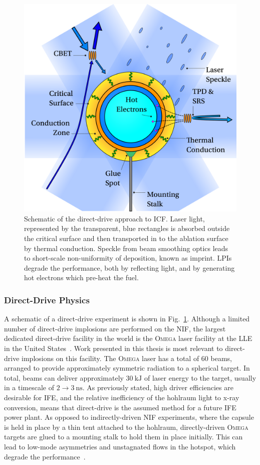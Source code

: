 \begin{figure}[t!]
    \includegraphics[width=0.7\linewidth]{Introduction/Images/direct icf white.png}
    \centering
    \caption{Schematic of the direct-drive approach to \ac{ICF}.
    Laser light, represented by the transparent, blue rectangles is absorbed outside the critical surface and then transported in to the ablation surface by thermal conduction.
    Speckle from beam smoothing optics leads to short-scale non-uniformity of deposition, known as imprint.
    \ac{LPIs} degrade the performance, both by reflecting light, and by generating hot electrons which pre-heat the fuel.
    }%
    \label{fig:intro_direct}
\end{figure}

\subsubsection{Direct-Drive Physics}%
\label{sec:intro_direct_phys}

A schematic of a direct-drive experiment is shown in Fig.~\ref{fig:intro_direct}.
Although a limited number of direct-drive implosions are performed on the \ac{NIF}, the largest dedicated direct-drive facility in the world is the \textsc{Omega} laser facility at the \ac{LLE} in the United States~\cite{simon_lle_1989,boehly_upgrade_1995}.
Work presented in this thesis is most relevant to direct-drive implosions on this facility.
The \textsc{Omega} laser has a total of 60 beams, arranged to provide approximately symmetric radiation to a spherical target.
In total, beams can deliver approximately $30\ \text{kJ}$ of laser energy to the target, usually in a timescale of $2\rightarrow3\ \text{ns}$.
As previously stated, high driver efficiencies are desirable for \ac{IFE}, and the relative inefficiency of the hohlraum light to x-ray conversion, means that direct-drive is the assumed method for a future \ac{IFE} power plant.
As opposed to indirectly-driven \ac{NIF} experiments, where the capsule is held in place by a thin tent attached to the hohlraum, directly-driven \textsc{Omega} targets are glued to a mounting stalk to hold them in place initially.
This can lead to low-mode asymmetries and unstagnated flows in the hotspot, which degrade the performance~\cite{gatujohnson_impact_2020}.

